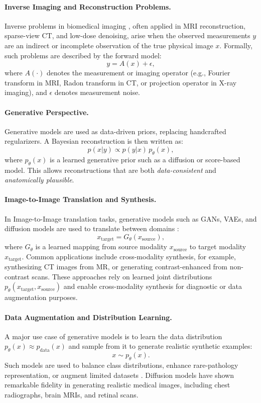 \paragraph{Inverse Imaging and Reconstruction Problems.}
Inverse problems in biomedical imaging \citep{accelerated_mri_motion_correction_2023, score_based_diffusion_mri_2022, cao2022spiritdiffusion}, often applied in MRI reconstruction, sparse-view CT, and low-dose denoising, arise when the observed measurements \( y \) are an indirect or incomplete observation of the true physical image \( x \). 
Formally, such problems are described by the forward model:
\[
y = A(x) + \epsilon,
\]
where \( A(\cdot) \) denotes the measurement or imaging operator (e.g., Fourier transform in MRI, Radon transform in CT, 
or projection operator in X-ray imaging), and \( \epsilon \) denotes measurement noise.

\paragraph{Generative Perspective.}
Generative models are used as data-driven priors, replacing handcrafted regularizers. 
A Bayesian reconstruction is then written as:
\[
p(x|y) \propto p(y|x)\,p_\theta(x),
\]
where \( p_\theta(x) \) is a learned generative prior such as a diffusion or score-based model. 
This allows reconstructions that are both \emph{data-consistent} and \emph{anatomically plausible}. 

\paragraph{Image-to-Image Translation and Synthesis.}
In Image-to-Image translation tasks, generative models such as GANs, VAEs, and diffusion models are used to translate between domains \citep{Lyu2022ConversionBC, Meng2022ANU}:
\[
x_\text{target} = G_\theta(x_\text{source}),
\]
where \( G_\theta \) is a learned mapping from source modality \( x_\text{source} \) to target modality \( x_\text{target} \).
Common applications include cross-modality synthesis, for example, synthesizing CT images from MR, or generating contrast-enhanced from non-contrast scans. 
These approaches rely on learned joint distributions \( p_\theta(x_\text{target}, x_\text{source}) \) and enable 
cross-modality synthesis for diagnostic or data augmentation purposes.

\paragraph{Data Augmentation and Distribution Learning.}
A major use case of generative models is to learn the data distribution \( p_\theta(x) \approx p_\text{data}(x) \) 
and sample from it to generate realistic synthetic examples:
\[
x \sim p_\theta(x).
\]
Such models are used to balance class distributions, enhance rare-pathology representation, or augment limited datasets \citep{generative_ai_medical_imaging_2025}. 
Diffusion models have shown remarkable fidelity in generating realistic medical images, including chest radiographs, 
brain MRIs, and retinal scans.


